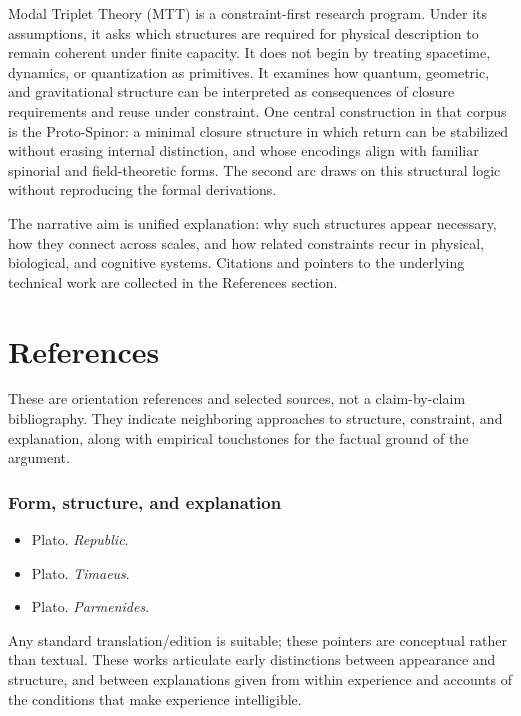 \documentclass[11pt,twoside,openright]{book}
\begin{document}
Modal Triplet Theory (MTT) is a constraint-first research program. Under its assumptions, it asks which structures are required for physical description to remain coherent under finite capacity. It does not begin by treating spacetime, dynamics, or quantization as primitives. It examines how quantum, geometric, and gravitational structure can be interpreted as consequences of closure requirements and reuse under constraint. One central construction in that corpus is the Proto-Spinor: a minimal closure structure in which return can be stabilized without erasing internal distinction, and whose encodings align with familiar spinorial and field-theoretic forms. The second arc draws on this structural logic without reproducing the formal derivations.

The narrative aim is unified explanation: why such structures appear necessary, how they connect across scales, and how related constraints recur in physical, biological, and cognitive systems. Citations and pointers to the underlying technical work are collected in the References section.

\endgroup

\chapter*{References}
{}

\noindent
These are orientation references and selected sources,
not a claim-by-claim bibliography.
They indicate neighboring approaches to structure,
constraint,
and explanation,
along with empirical touchstones for the factual ground of the argument.

\medskip

\subsection*{Form, structure, and explanation}

\begin{itemize}
  \setlength{\itemsep}{0.2em}
  \setlength{\parskip}{0pt}
  \item Plato. \emph{Republic}.
  \item Plato. \emph{Timaeus}.
  \item Plato. \emph{Parmenides}.
\end{itemize}

\noindent
Any standard translation/edition is suitable; these pointers are conceptual rather than textual.
These works articulate early distinctions between appearance and structure, and
between explanations given from within experience and accounts of the conditions
that make experience intelligible.
\end{document}
